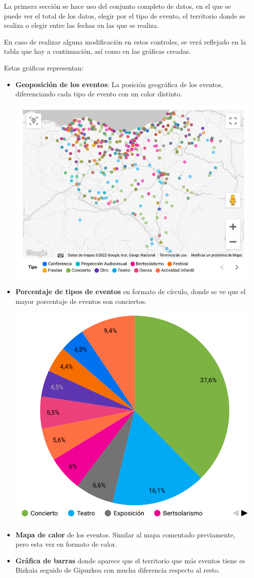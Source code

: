 \documentclass{\ClassPath/viu-tfm-template}
\begin{document}
La primera sección se hace uso del conjunto completo de datos, en el que se puede ver el total de los datos, elegir por el tipo de evento, el territorio donde se realiza o elegir entre las fechas en las que se realiza.

En caso de realizar alguna modificación en estos controles, se verá reflejado en la tabla que hay a continuación, así como en las gráficas creadas.

Estas gráficas representan:
\begin{itemize}
    \item \textbf{Geoposición de los eventos}: La posición geográfica de los eventos, diferenciando cada tipo de evento con un color distinto.
    \begin{center}
        \includegraphics[width=0.6\linewidth]{img/mapa1.png}
    \end{center}

    \item \textbf{Porcentaje de tipos de eventos} en formato de círculo, donde se ve que el mayor porcentaje de eventos son conciertos.
    \begin{center}
        \includegraphics[width=0.6\linewidth]{img/circulo.png}
    \end{center}

    \item \textbf{Mapa de calor} de los eventos. Similar al mapa comentado previamente, pero esta vez en formato de calor.

    \item \textbf{Gráfica de barras} donde aparece que el territorio que más eventos tiene es Bizkaia seguido de Gipuzkoa con mucha diferencia respecto al resto.
\end{itemize}
\end{document}
